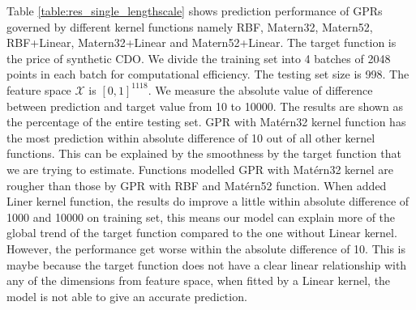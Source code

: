 \documentclass[11pt,a4paper]{article}
\theoremstyle{definition}
\numberwithin{equation}{section}
\begin{document}
	Table \ref{table:res_single_lengthscale} shows prediction performance of GPRs governed by different kernel functions namely RBF, Matern32, Matern52, RBF+Linear, Matern32+Linear and Matern52+Linear. The target function is the price of synthetic CDO. We divide the training set into 4 batches of 2048 points in each batch for computational efficiency. The testing set size is 998. The feature space $\mathcal X$ is $[0,1]^{1118}$. We measure the absolute value of difference between prediction and target value from 10 to 10000. The results are shown as the percentage of the entire testing set. GPR with Mat\'ern32 kernel function has the most prediction within absolute difference of 10 out of all other kernel functions. This can be explained by the smoothness by the target function that we are trying to estimate. Functions modelled GPR with Mat\'ern32 kernel are rougher than those by GPR with RBF and Mat\'ern52 function. When added Liner kernel function, the results do improve a little within absolute difference of 1000 and 10000 on training set, this means our model can explain more of the global trend of the target function compared to the one without Linear kernel. However, the performance get worse within the absolute difference of 10. This is maybe because the target function does not have a clear linear relationship with any of the dimensions from feature space, when fitted by a Linear kernel, the model is not able to give an accurate prediction.
	
\end{document}
